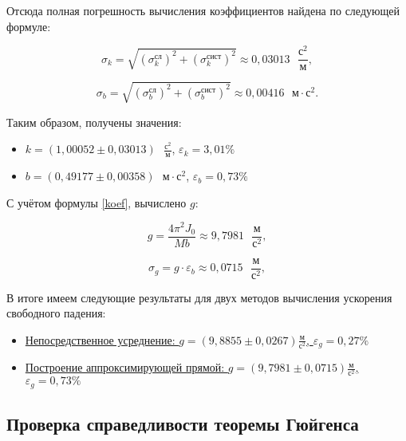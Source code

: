 \documentclass[a4paper,12pt]{article} %
\begin{document}
Отсюда полная погрешность вычисления коэффициентов найдена по следующей формуле:

\begin{equation}
\sigma_k = \sqrt{\left( \sigma_k^\text{сл} \right)^2 + \left( \sigma_k^\text{сист} \right)^2 } \approx 0,03013 \text{ }\frac{\text{с}^2}{\text{м}},
\end{equation}

\begin{equation}
\sigma_b = \sqrt{\left( \sigma_b^\text{сл} \right)^2 + \left( \sigma_b^\text{сист} \right)^2 } \approx 0,00416 \text{ }\text{м}\cdot\text{с}^2.
\end{equation}

Таким образом, получены значения:
\begin{itemize}
	\item $ k = \left( 1,00052\pm0,03013\right)  \text{ }\frac{\text{с}^2}{\text{м}} $, $ \varepsilon_k = 3,01 \% $
	\item $ b = \left( 0,49177\pm0,00358\right)  \text{ }\text{м}\cdot\text{с}^2 $, $ \varepsilon_b = 0,73 \% $
\end{itemize}

С учётом формулы \eqref{koef}, вычислено $ g $:

\begin{equation}
g = \frac{4\pi^2J_0}{Mb} \approx 9,7981 \text{ }\frac{\text{м}}{\text{с}^2},
\end{equation}

\begin{equation}
\sigma_g = g\cdot\varepsilon_b \approx 0,0715 \text{ }\frac{\text{м}}{\text{с}^2},
\end{equation}


В итоге имеем следующие результаты для двух методов вычисления ускорения свободного падения:

\begin{itemize}
	\item \underline{Непосредственное усреднение: $ g = \left( 9,8855\pm0,0267\right) \frac{\text{м}}{\text{с}^2} $, $ \varepsilon_g=0,27\% $}
	\item \underline{Построение аппроксимирующей прямой: $ g = \left( 9,7981\pm0,0715\right) \frac{\text{м}}{\text{с}^2} $, $ \varepsilon_g=0,73\% $}
\end{itemize}

\subsection{Проверка справедливости теоремы Гюйгенса}
\end{document}
